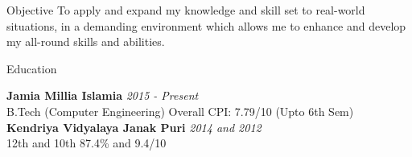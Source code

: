 \documentclass{resume} %
\begin{document}


\begin{rSection}{Objective}
To apply and expand my knowledge and skill set to real-world situations, in a demanding environment which allows me to enhance and develop my all-round skills and abilities.
\end{rSection}


\begin{rSection}{Education}

{\bf Jamia Millia Islamia} \hfill {\em 2015 - Present} 
\\ B.Tech (Computer Engineering) \hfill { Overall CPI: 7.79/10 (Upto 6th Sem)} 
\\{\bf Kendriya Vidyalaya Janak Puri} \hfill {\em 2014 and 2012} \\
12th and 10th \hfill {87.4\% and 9.4/10}


\end{rSection}
\end{document}
